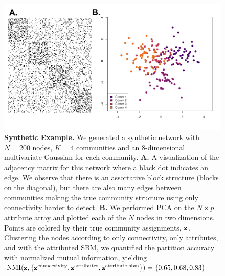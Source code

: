 \begin{figure}[h!]
\begin{center}
\includegraphics[width=1\textwidth]{SyntheticFig.pdf}
\caption{{\bf Synthetic Example.} We generated a synthetic network with $N=200$ nodes, $K=4$ communities and an 8-dimensional multivariate Gaussian for each community. {\bf A.} A visualization of the adjacency matrix for this network where a black dot indicates an edge. We observe that there is an assortative block structure (blocks on the diagonal), but there are also many edges between communities making the true community structure using only connectivity harder to detect. {\bf B.} We performed PCA on the $N \times p$ attribute array and plotted each of the $N$ nodes in two dimensions. Points are colored by their true community assignments, ${\bf z}$. Clustering the nodes according to only connectivity, only attributes, and with the attributed SBM, we quantified the partition accuracy with normalized mutual information, yielding $\text{NMI}({\bf z},\{{\bf z}^{\text{connectivity}}, {\bf z}^{\text{attributes}},{\bf z}^{\text{attribute sbm}}\})=\{0.65,0.68,0.83\}$.}
\label{Fig2}
\end{center}
\end{figure}

